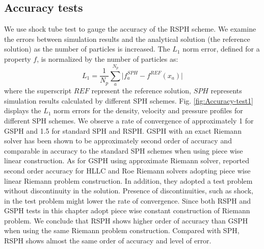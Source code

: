 \subsection{Accuracy tests}
We use shock tube test to gauge the accuracy of the RSPH scheme.
We examine the errors between simulation results and the analytical solution (the reference solution) as the number of particles is increased. The $L_1$ norm error, defined for a property $f$, is normalized by the number of particles as:
\begin{equation}
L_1= \frac{1}{N_p} \sum_a^{N_p} \vert f_a^{SPH} - f^{REF} (x_a) \vert 
\end{equation}
where the superscript $REF$ represent the reference solution, $SPH$ represents simulation results calculated by different SPH schemes. Fig. \ref{fig:Accuracy-test1} displays the $L_1$ norm errors for the density, velocity and pressure profiles for different SPH schemes.
We observe a rate of convergence of approximately 1 for GSPH and 1.5 for standard SPH and RSPH.
GSPH with an exact Riemann solver has been shown to be approximately second order of accuracy \citep{puri2014comparison} and comparable in accuracy to the standard SPH schemes when using piece wise linear construction. As for GSPH using approximate Riemann solver, \citet{puri2014approximate} reported second order accuracy for HLLC and Roe Riemann solvers adopting piece wise linear Riemann problem construction. In addition, they adopted a test problem without discontinuity in the solution. Presence of discontinuities, such as shock, in the test problem might lower the rate of convergence. Since both RSPH and GSPH tests in this chapter adopt piece wise constant construction of Riemann problem. We conclude that RSPH shows higher order of accuracy than GSPH when using the same Riemann problem construction. Compared with SPH, RSPH shows almost the same order of accuracy and level of error.  
